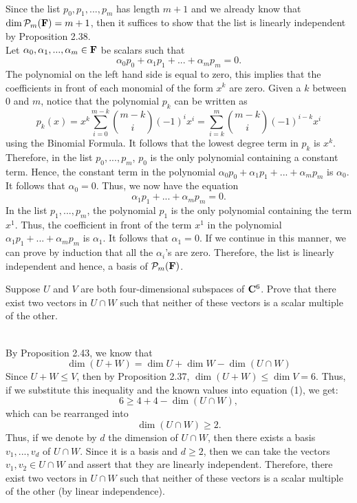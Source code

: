 \begin{solution}
    \\ Since the list $p_0,p_1, ..., p_m$ has length $m+1$ and we already know that $\dim \mathcal{P}_m(\mathbf{F}) = m+1$, then it suffices to show that the list is linearly independent by Proposition 2.38. \\
    Let $\alpha_0, \alpha_1, ..., \alpha_m \in \mathbf{F}$ be scalars such that
    $$\alpha_0 p_0 + \alpha_1 p_1 + ... + \alpha_m p_m = 0.$$
    The polynomial on the left hand side is equal to zero, this implies that the coefficients in front of each monomial of the form $x^k$ are zero. Given a $k$ between 0 and $m$, notice that the polynomial $p_k$ can be written as
    $$p_k(x) = x^k \sum_{i=0}^{m-k}\binom{m-k}{i}(-1)^ix^i = \sum_{i=k}^{m}\binom{m-k}{i}(-1)^{i-k}x^i$$
    using the Binomial Formula. It follows that the lowest degree term in $p_k$ is $x^k$. Therefore, in the list $p_0, ..., p_m$, $p_0$ is the only polynomial containing a constant term. Hence, the constant term in the polynomial $\alpha_0 p_0 + \alpha_1 p_1 + ... + \alpha_m p_m$ is $\alpha_0$. It follows that $\alpha_0 = 0$. Thus, we now have the equation
    $$\alpha_1 p_1 + ... + \alpha_m p_m = 0.$$
    In the list $p_1, ..., p_m$, the polynomial $p_1$ is the only polynomial containing the term $x^1$. Thus, the coefficient in front of the term $x^1$ in the polynomial $\alpha_1 p_1 + ... + \alpha_m p_m$ is $\alpha_1$. It follows that $\alpha_1 = 0$. If we continue in this manner, we can prove by induction that all the $\alpha_i$'s are zero. Therefore, the list is linearly independent and hence, a basis of $\mathcal{P}_m(\mathbf{F})$.\\
\end{solution}

\begin{exercise}
    Suppose $U$ and $V$ are both four-dimensional subspaces of $\mathbf{C}^6$. Prove that there exist two vectors in $U \cap W$ such that neither of these vectors is a scalar multiple of the other. \\
\end{exercise}

\begin{solution}
    \\ By Proposition 2.43, we know that
    \[ \dim(U+W) = \dim U + \dim W - \dim(U \cap W) \tag*{(1)} \]
    Since $U + W \leq V$, then by Proposition 2.37, $\dim (U+W) \leq \dim V = 6$. Thus, if we substitute this inequality and the known values into equation (1), we get: 
    $$6 \geq 4 + 4 - \dim (U \cap W),$$
    which can be rearranged into
    $$\dim(U\cap W) \geq 2.$$
    Thus, if we denote by $d$ the dimension of $U \cap W$, then there exists a basis $v_1, ..., v_d$ of $U \cap W$. Since it is a basis and $d \geq 2$, then we can take the vectors $v_1, v_2 \in U\cap W$ and assert that they are linearly independent. Therefore, there exist two vectors in $U \cap W$ such that neither of these vectors is a scalar multiple of the other (by linear independence). \\
\end{solution}

